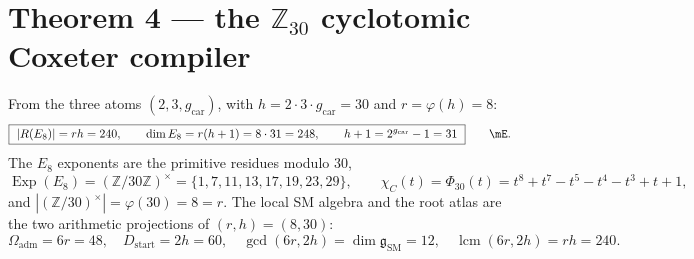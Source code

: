 \documentclass[11pt,a4paper]{article}
\newcommand{\gcar}{g_{\mathrm{car}}}
\newcommand{\Oadm}{\Omega_{\mathrm{adm}}}
\newcommand{\dimg}{\dim\mathfrak g_{\mathrm{SM}}}
\theoremstyle{definition}
\begin{document}
\section*{Theorem 4 --- the $\mathbb Z_{30}$ cyclotomic Coxeter compiler}
From the three atoms $(2,3,\gcar)$, with $h=2\cdot3\cdot\gcar=30$ and $r=\varphi(h)=8$:
\begin{equation}
  \boxed{\ |R(E_8)|=rh=240,\qquad \dim E_8=r(h+1)=8\cdot31=248,\qquad h+1=2^{\gcar}-1=31\ }\qquad\mE .
\end{equation}
The $E_8$ exponents are the primitive residues modulo $30$,
\begin{equation}
  \operatorname{Exp}(E_8)=(\mathbb Z/30\mathbb Z)^\times=\{1,7,11,13,17,19,23,29\},\qquad
  \chi_C(t)=\Phi_{30}(t)=t^8+t^7-t^5-t^4-t^3+t+1 ,
\end{equation}
and $|(\mathbb Z/30)^\times|=\varphi(30)=8=r$. The local SM algebra and the root atlas are the two
arithmetic projections of $(r,h)=(8,30)$:
\begin{equation}
  \Oadm=6r=48,\quad D_{\mathrm{start}}=2h=60,\quad \gcd(6r,2h)=\dimg=12,\quad \operatorname{lcm}(6r,2h)=rh=240 .
\end{equation}

\end{document}
